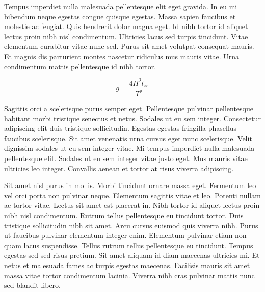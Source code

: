 \documentclass{article}
\begin{document}
    Tempus imperdiet nulla malesuada pellentesque elit eget gravida. In eu mi bibendum neque egestas congue quisque egestas. Massa sapien faucibus et molestie ac feugiat. Quis hendrerit dolor magna eget. Id nibh tortor id aliquet lectus proin nibh nisl condimentum. Ultricies lacus sed turpis tincidunt. Vitae elementum curabitur vitae nunc sed. Purus sit amet volutpat consequat mauris. Et magnis dis parturient montes nascetur ridiculus mus mauris vitae. Urna condimentum mattis pellentesque id nibh tortor.
    
    \begin{equation}
    	g=\frac{4\Pi^2l_{zr}}{T^2}
    \end{equation}
    
    Sagittis orci a scelerisque purus semper eget. Pellentesque pulvinar pellentesque habitant morbi tristique senectus et netus. Sodales ut eu sem integer. Consectetur adipiscing elit duis tristique sollicitudin. Egestas egestas fringilla phasellus faucibus scelerisque. Sit amet venenatis urna cursus eget nunc scelerisque. Velit dignissim sodales ut eu sem integer vitae. Mi tempus imperdiet nulla malesuada pellentesque elit. Sodales ut eu sem integer vitae justo eget. Mus mauris vitae ultricies leo integer. Convallis aenean et tortor at risus viverra adipiscing.
    
    Sit amet nisl purus in mollis. Morbi tincidunt ornare massa eget. Fermentum leo vel orci porta non pulvinar neque. Elementum sagittis vitae et leo. Potenti nullam ac tortor vitae. Lectus sit amet est placerat in. Nibh tortor id aliquet lectus proin nibh nisl condimentum. Rutrum tellus pellentesque eu tincidunt tortor. Duis tristique sollicitudin nibh sit amet. Arcu cursus euismod quis viverra nibh. Purus ut faucibus pulvinar elementum integer enim. Elementum pulvinar etiam non quam lacus suspendisse. Tellus rutrum tellus pellentesque eu tincidunt. Tempus egestas sed sed risus pretium. Sit amet aliquam id diam maecenas ultricies mi. Et netus et malesuada fames ac turpis egestas maecenas. Facilisis mauris sit amet massa vitae tortor condimentum lacinia. Viverra nibh cras pulvinar mattis nunc sed blandit libero.
    
\end{document}
